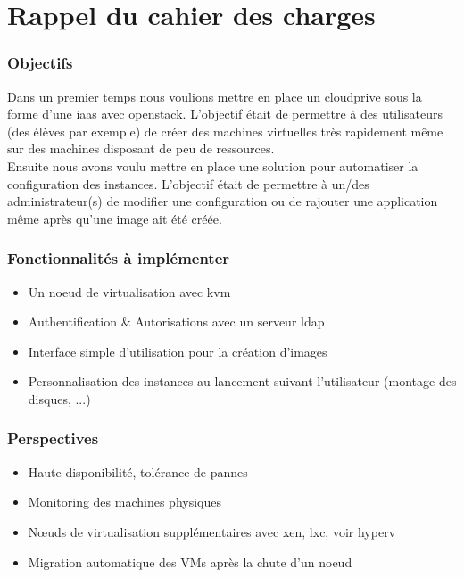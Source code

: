\documentclass[a4paper,oneside]{report}
\begin{document}
\section{Rappel du cahier des charges}
\subsubsection{Objectifs}
Dans un premier temps nous voulions mettre en place un \gls{cloudprive} sous la forme d'une \gls{iaas} avec \gls{openstack}.
L'objectif était de permettre à des utilisateurs (des élèves par exemple) de créer des machines virtuelles très rapidement même sur des machines disposant de peu de ressources.\\

Ensuite nous avons voulu mettre en place une solution pour automatiser la configuration des instances.
L'objectif était de permettre à un/des administrateur(s) de modifier une configuration ou de rajouter une application même après qu'une image ait été créée.

\subsubsection{Fonctionnalités à implémenter}
\begin{itemize}
\item Un noeud de \gls{virtualisation} avec \gls{kvm}
\item Authentification \& Autorisations avec un serveur \gls{ldap}
\item Interface simple d'utilisation pour la création d'images
\item Personnalisation des instances au lancement suivant l'utilisateur (montage des disques, ...)
\end{itemize}

\subsubsection{Perspectives}
\begin{itemize}
\item Haute-disponibilité, tolérance de pannes
\item Monitoring des machines physiques
\item Nœuds de \gls{virtualisation} supplémentaires avec \gls{xen}, \gls{lxc}, voir \gls{hyperv}
\item Migration automatique des VMs après la chute d'un noeud
\end{itemize}
\end{document}
